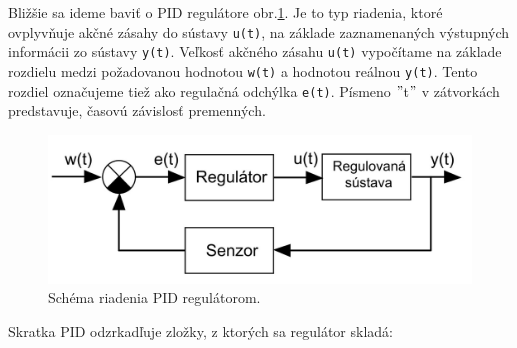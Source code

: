 Bližšie sa ideme baviť o PID regulátore obr.\ref{OBRAZOK 3.3}. Je to typ riadenia, ktoré ovplyvňuje akčné zásahy do sústavy \verb|u(t)|, na základe zaznamenaných výstupných informácii zo sústavy \verb|y(t)|. Veľkosť akčného zásahu \verb|u(t)| vypočítame na základe rozdielu medzi požadovanou hodnotou \verb|w(t)| a hodnotou reálnou \verb|y(t)|. Tento rozdiel označujeme tiež ako regulačná odchýlka \verb|e(t)|. Písmeno $"$t$"$ v zátvorkách predstavuje, časovú závislosť premenných. 

\begin{figure}[!tbh]
	\centering
	\includegraphics[width=120mm]{obr/pid.jpg}
	\caption{Schéma riadenia PID regulátorom.}\label{OBRAZOK 3.3}
\end{figure}

Skratka PID odzrkadľuje zložky, z ktorých sa regulátor skladá: 

